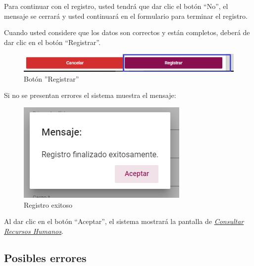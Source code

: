             Para continuar con el registro, usted tendrá que  dar clic el botón “No”, el mensaje se cerrará y usted continuará en el formulario para terminar el registro.

            Cuando usted considere que los datos son correctos y están completos, deberá de dar clic en el botón “Registrar”.

            \begin{figure}[H]
                \centering
                \hypertarget{btnreg}{\includegraphics[width=0.7\linewidth]{images/SP1/BtnRegistrar}}
                \caption{Botón ''Registrar''}
                \label{btnreg}
            \end{figure}

            Si no se presentan errores el sistema muestra el mensaje:


             \begin{figure}[H]
                \centering
            \includegraphics[width=0.4\linewidth]{images/SP1/MSG5}
                \caption{Registro exitoso}
                \label{mensaje5}

            \end{figure}

            Al dar clic en el botón “Aceptar”, el sistema mostrará la pantalla de  \hyperlink{consultarRH}{\textit{Consultar Recursos Humanos}}.

            \subsection{Posibles errores}

